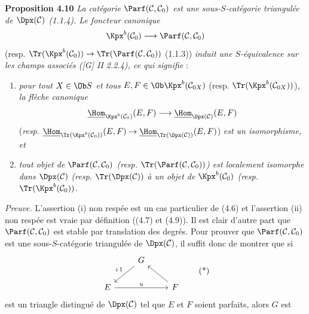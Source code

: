 \textbf{Proposition 4.10} \emph{La catégorie \(\Parf(\mathcal C,\mathcal C_0)\) est une sous-\(S\)-catégorie triangulée de \(\Dpx(\mathcal C)\) (1.1.4). Le foncteur canonique}
\[
  \Kpx^b(\mathcal C_0)\longrightarrow\Parf(\mathcal C,\mathcal C_0)
\]
(resp. \(\Tr(\Kpx^b(\mathcal C_0))\to\Tr(\Parf(\mathcal C,\mathcal C_0))\) (1.1.3)) \emph{induit une \(S\)-équivalence sur les champs associés ([G] II 2.2.4), ce qui signifie} :
\begin{enumerate}[label=(\roman*)]
\item \emph{pour tout \(X\in\Ob S\) et tous} \(E,F\in\Ob\Kpx^b(\mathcal C_{0X})\) (resp. \(\Tr(\Kpx^b(\mathcal C_{0X}))\)), \emph{la flèche canonique}
\[
  \underline{\Hom}_{\Kpx^b(\mathcal C_0)}(E,F)
  \longrightarrow
  \underline{\Hom}_{\Dpx(\mathcal C)}(E,F)
\]
(\emph{resp.} \(\underline{\Hom}_{\Tr(\Kpx^b(\mathcal C_0))}(E,F)\to\underline{\Hom}_{\Tr(\Dpx(\mathcal C))}(E,F)\)) \emph{est un isomorphisme, et}
\item \emph{tout objet de \(\Parf(\mathcal C,\mathcal C_0)\) (resp. \(\Tr(\Parf(\mathcal C,\mathcal C_0))\)) est localement isomorphe dans \(\Dpx(\mathcal C)\) (resp.} \(\Tr(\Dpx(\mathcal C))\) \emph{à un objet de \(\Kpx^b(\mathcal C_0)\) (resp.} \(\Tr(\Kpx^b(\mathcal C_0))\).
\end{enumerate}

\emph{Preuve.} L'assertion (i) non respée est un cas particulier de (4.6) et l'assertion (ii) non respée est vraie par définition ((4.7) et (4.9)). Il est clair d'autre part que \(\Parf(\mathcal C,\mathcal C_0)\) est stable par translation des degrés. Pour prouver que \(\Parf(\mathcal C,\mathcal C_0)\) est une sous-\(S\)-catégorie triangulée de \(\Dpx(\mathcal C)\), il suffit donc de montrer que si
\[
\begin{tikzcd}
& G \arrow[dl,"+1"'] & \\
E \arrow[rr,"u"] && F \arrow[ul]
\end{tikzcd}
\tag{*}
\]
est un triangle distingué de \(\Dpx(\mathcal C)\) tel que \(E\) et \(F\) soient parfaits, alors \(G\) est

